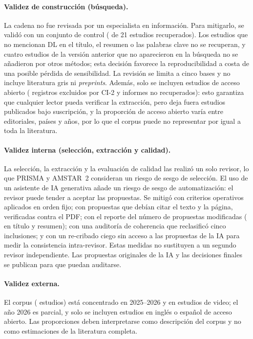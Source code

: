 \documentclass[12pt, a4paper]{article}
\begin{document}
\paragraph{Validez de construcción (búsqueda).} La cadena no fue revisada por un especialista en información. Para mitigarlo, se validó con un conjunto de control (\NsensibOK{} de 21 estudios recuperados). Los estudios que no mencionan DL en el título, el resumen o las palabras clave no se recuperan, y cuatro estudios de la versión anterior que no aparecieron en la búsqueda no se añadieron por otros métodos; esta decisión favorece la reproducibilidad a costa de una posible pérdida de sensibilidad. La revisión se limita a cinco bases y no incluye literatura gris ni \textit{preprints}. Además, solo se incluyen estudios de acceso abierto (\NexclOA{} registros excluidos por CI-2 y \PnoRecuperados{} informes no recuperados): esto garantiza que cualquier lector pueda verificar la extracción, pero deja fuera estudios publicados bajo suscripción, y la proporción de acceso abierto varía entre editoriales, países y años, por lo que el corpus puede no representar por igual a toda la literatura.

\paragraph{Validez interna (selección, extracción y calidad).} La selección, la extracción y la evaluación de calidad las realizó un solo revisor, lo que PRISMA y AMSTAR~2 consideran un riesgo de sesgo de selección. El uso de un asistente de IA generativa añade un riesgo de sesgo de automatización: el revisor puede tender a aceptar las propuestas. Se mitigó con criterios operativos aplicados en orden fijo; con propuestas que debían citar el texto y la página, verificadas contra el PDF; con el reporte del número de propuestas modificadas (\NCambiosIATA{} en título y resumen); con una auditoría de coherencia que reclasificó cinco inclusiones; y con un re-cribado ciego sin acceso a las propuestas de la IA para medir la consistencia intra-revisor. Estas medidas no sustituyen a un segundo revisor independiente. Las propuestas originales de la IA y las decisiones finales se publican para que puedan auditarse.

\paragraph{Validez externa.} El corpus (\Nestudios{} estudios) está concentrado en 2025--2026 y en estudios de video; el año 2026 es parcial, y solo se incluyen estudios en inglés o español de acceso abierto. Las proporciones deben interpretarse como descripción del corpus y no como estimaciones de la literatura completa.
\end{document}
